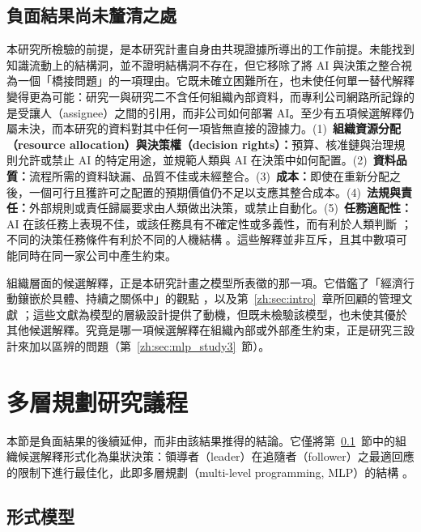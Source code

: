 \subsection{負面結果尚未釐清之處}
\label{zh:sec:discussion_hypothesis}

本研究所檢驗的前提，是本研究計畫自身由共現證據所導出的工作前提。未能找到知識流動上的結構洞，並不證明結構洞不存在，但它移除了將 AI 與決策之整合視為一個「橋接問題」的一項理由。它既未確立困難所在，也未使任何單一替代解釋變得更為可能：研究一與研究二不含任何組織內部資料，而專利公司網路所記錄的是受讓人（assignee）之間的引用，而非公司如何部署 AI。至少有五項候選解釋仍屬未決，而本研究的資料對其中任何一項皆無直接的證據力。(1)~\textbf{組織資源分配（resource allocation）與決策權（decision rights）：}預算、核准鏈與治理規則允許或禁止 AI 的特定用途，並規範人類與 AI 在決策中如何配置。(2)~\textbf{資料品質：}流程所需的資料缺漏、品質不佳或未經整合。(3)~\textbf{成本：}即使在重新分配之後，一個可行且獲許可之配置的預期價值仍不足以支應其整合成本。(4)~\textbf{法規與責任：}外部規則或責任歸屬要求由人類做出決策，或禁止自動化。(5)~\textbf{任務適配性：}AI 在該任務上表現不佳，或該任務具有不確定性或多義性，而有利於人類判斷 \citep{jarrahi2018artificial}；不同的決策任務條件有利於不同的人機結構 \citep{shrestha2019organizational}。這些解釋並非互斥，且其中數項可能同時在同一家公司中產生約束。

組織層面的候選解釋，正是本研究計畫之模型所表徵的那一項。它借鑑了「經濟行動鑲嵌於具體、持續之關係中」的觀點 \citep{granovetter1985economic}，以及第~\ref{zh:sec:intro}~章所回顧的管理文獻 \citep{shrestha2019organizational,raisch2021artificial,berente2021managing}；這些文獻為模型的層級設計提供了動機，但既未檢驗該模型，也未使其優於其他候選解釋。究竟是哪一項候選解釋在組織內部或外部產生約束，正是研究三設計來加以區辨的問題（第~\ref{zh:sec:mlp_study3}~節）。

\section{多層規劃研究議程}
\label{zh:sec:mlp}

本節是負面結果的後續延伸，而非由該結果推得的結論。它僅將第~\ref{zh:sec:discussion_hypothesis}~節中的組織候選解釋形式化為巢狀決策：領導者（leader）在追隨者（follower）之最適回應的限制下進行最佳化，此即多層規劃（multi-level programming, MLP）的結構 \citep{dempe2002foundations,colson2007overview}。

\subsection{形式模型}
\label{zh:sec:mlp_model}

